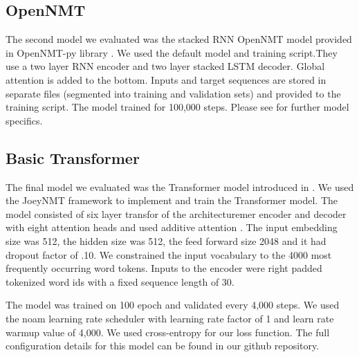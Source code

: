 \documentclass[letterpaper]{article} %
\begin{document}
\subsection{OpenNMT}
The second model we evaluated was the stacked RNN OpenNMT model provided in OpenNMT-py library \cite{klein-etal-2018-opennmt}. We used the default model and training script.They use a two layer RNN encoder and two layer stacked LSTM decoder. Global attention is added to the bottom. Inputs and target sequences are stored in separate files (segmented into training and validation sets) and provided to the training script. The model trained for 100,000 steps. Please see \citeauthor{klein-etal-2018-opennmt} for further model specifics.

\subsection{Basic Transformer}
The final model we evaluated was the Transformer model introduced in \citeauthor{NIPS2017_7181} \citeyear{NIPS2017_7181}. We used the JoeyNMT framework to implement and train the Transformer model. The model consisted of six layer transfor of the architecturemer encoder and decoder with eight attention heads and used additive attention \cite{bahdanau2014neural}. The input embedding size was 512, the hidden size was 512, the feed forward size 2048 and it had dropout factor of .10. We constrained the input vocabulary to the 4000 most frequently occurring word tokens. Inputs to the encoder were right padded tokenized word ids with a fixed sequence length of 30.

The model was trained on 100 epoch and validated every 4,000 steps. We used the noam learning rate scheduler \cite{DBLP:journals/corr/abs-1804-04235} with learning rate factor of 1 and learn rate warmup value of 4,000. We used cross-entropy for our loss function. The full configuration details for this model can be found in our github repository.
\end{document}
